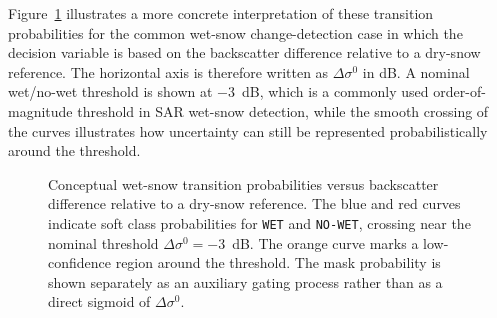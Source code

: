Figure~\ref{fig:wetsnow_sigmoid_concept} illustrates a more concrete
interpretation of these transition probabilities for the common wet-snow
change-detection case in which the decision variable is based on the
backscatter difference relative to a dry-snow reference. The horizontal axis is
therefore written as $\Delta\sigma^0$ in dB. A nominal wet/no-wet threshold is
shown at $-3$~dB, which is a commonly used order-of-magnitude threshold in SAR
wet-snow detection, while the smooth crossing of the curves illustrates how
uncertainty can still be represented probabilistically around the threshold.

\begin{figure}[ht]
  \centering
  \caption[Conceptual wet-snow transition probabilities]{Conceptual wet-snow transition probabilities versus backscatter difference relative to a dry-snow reference. The blue and red curves indicate soft class probabilities for \texttt{WET} and \texttt{NO-WET}, crossing near the nominal threshold $\Delta\sigma^0=-3$~dB. The orange curve marks a low-confidence region around the threshold. The mask probability is shown separately as an auxiliary gating process rather than as a direct sigmoid of $\Delta\sigma^0$.}
  \label{fig:wetsnow_sigmoid_concept}
\end{figure}

